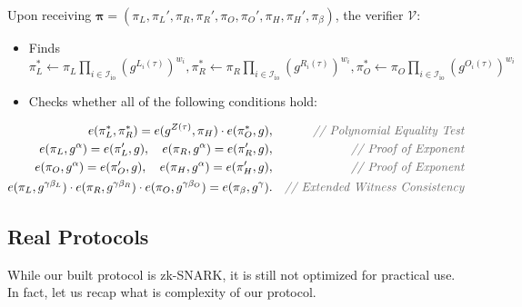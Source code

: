 \documentclass[../lecture-notes.tex]{subfiles}
\begin{document}
\begin{tcolorbox}
    Upon receiving $\boldsymbol{\pi} = (\pi_L,\pi_L',\pi_R,\pi_R',\pi_O,\pi_O',\pi_H,\pi_H',\pi_{\beta})$, the verifier $\mathcal{V}$:
    \begin{itemize}[label=]
        \item Finds $\pi_L^* \gets \pi_L\prod_{i \in \mathcal{I}_{\text{io}}} (g^{L_i(\tau)})^{w_i},\pi_R^* \gets \pi_R\prod_{i \in \mathcal{I}_{\text{io}}} (g^{R_i(\tau)})^{w_i},\pi_O^* \gets \pi_O\prod_{i \in \mathcal{I}_{\text{io}}} (g^{O_i(\tau)})^{w_i}$
        \item Checks whether all of the following conditions hold:
    \end{itemize}
    \begin{align*}
        e(\pi_L^*, \pi_R^*) = e(g^{Z(\tau)}, \pi_H) \cdot e(\pi_O^*, g),&& \textcolor{gray!80!black}{\textit{// Polynomial Equality Test}} \\
        e(\pi_L, g^{\alpha}) = e(\pi_L', g), \quad e(\pi_R, g^{\alpha}) = e(\pi_R', g),&& \textcolor{gray!80!black}{\textit{// Proof of Exponent}} \\
        e(\pi_O, g^{\alpha}) = e(\pi_O', g), \quad e(\pi_H, g^{\alpha}) = e(\pi_H', g),&& \textcolor{gray!80!black}{\textit{// Proof of Exponent}} \\
        e(\pi_L, g^{\gamma\beta_L}) \cdot e(\pi_R, g^{\gamma\beta_R}) \cdot e(\pi_O, g^{\gamma\beta_O}) = e(\pi_{\beta}, g^{\gamma}).&& \textcolor{gray!80!black}{\textit{// Extended Witness Consistency}}
    \end{align*}
\end{tcolorbox}

\subsection{Real Protocols}

While our built protocol is zk-SNARK, it is still not optimized for practical use. In fact, let us recap what is complexity of our protocol.
\end{document}
